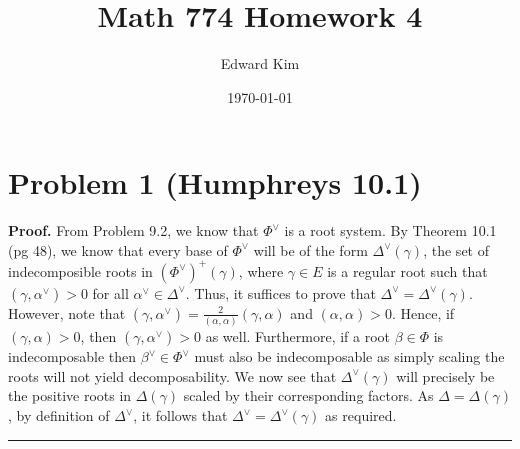 \documentclass[12pt]{article}%
\newenvironment{proof}[1][Proof]{\textbf{#1.} }{\ \rule{0.5em}{0.5em}}
\begin{document}
\title{Math 774 Homework 4}
\author{Edward Kim}
\date{\today}
\maketitle

\section*{Problem 1 (Humphreys 10.1)}
\begin{proof}
  From Problem 9.2, we know that $\Phi^{\vee}$ is a root system. By Theorem 10.1 (pg 48), we know that every base of $\Phi^{\vee}$ will be of the form $\Delta^{\vee}(\gamma)$, the set of indecomposible roots in $(\Phi^{\vee})^{+}(\gamma)$, where
  $\gamma \in E$ is a regular root such that $(\gamma,\alpha^{\vee}) > 0$ for all $\alpha^{\vee} \in \Delta^{\vee}$. Thus, it suffices to prove that $\Delta^{\vee} = \Delta^{\vee}(\gamma)$. However, note that $(\gamma,\alpha^{\vee}) = \frac{2}{(\alpha,\alpha)}(\gamma,\alpha)$ and $(\alpha,\alpha) > 0$. Hence, if $(\gamma, \alpha) > 0$, then $(\gamma,\alpha^{\vee}) > 0$ as well. Furthermore, if a root $\beta \in \Phi$ is indecomposable then $\beta^{\vee} \in \Phi^{\vee}$ must also be indecomposable as simply scaling the roots will not yield decomposability. We now see that $\Delta^{\vee}(\gamma)$ will precisely be the positive roots in $\Delta(\gamma)$ scaled by their corresponding factors. As $\Delta = \Delta(\gamma)$, by definition of $\Delta^{\vee}$, it follows that $\Delta^{\vee} = \Delta^{\vee}(\gamma)$ as required.
\end{proof}
\end{document}
